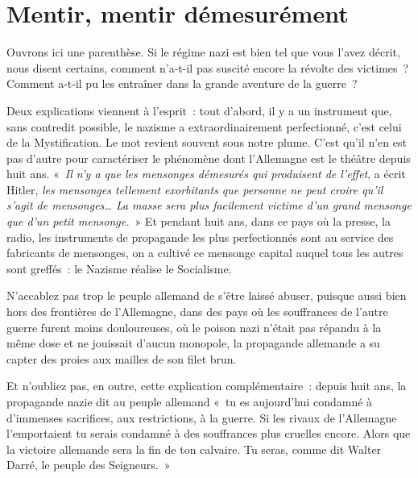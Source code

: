 \documentclass[french,twoside]{book} %
\begin{document}
\section[Mentir, mentir démesurément]{Mentir, mentir démesurément}
\noindent Ouvrons ici une parenthèse. Si le régime nazi est bien tel que vous l’avez décrit, nous disent certains, comment n’a-t-il pas suscité encore la révolte des victimes ? Comment a-t-il pu les entraîner dans la grande aventure de la guerre ?\par
Deux explications viennent à l’esprit : tout d’abord, il y a un instrument que, sans contredit possible, le nazisme a extraordinairement perfectionné, c’est celui de la Mystification. Le mot revient souvent sous notre plume. C’est qu’il n’en est pas d’autre pour caractériser le phénomène dont l’Allemagne est le théâtre depuis huit ans. « \emph{Il n’y a que les mensonges démesurés qui produisent de l’effet}, a écrit Hitler, \emph{les mensonges tellement exorbitants que personne ne peut croire qu’il s’agit de mensonges… La masse sera plus facilement victime d’un grand mensonge que d’un petit mensonge.} » Et pendant huit ans, dans ce pays où la presse, la radio, les instruments de propagande les plus perfectionnés sont au service des fabricants de mensonges, on a cultivé ce mensonge capital auquel tous les autres sont greffés : le Nazisme réalise le Socialisme.\par
N’accablez pas trop le peuple allemand de s’être laissé abuser, puisque aussi bien hors des frontières de l’Allemagne, dans des pays où les souffrances de l’autre guerre furent moins douloureuses, où le poison nazi n’était pas répandu à la même dose et ne jouissait d’aucun monopole, la propagande allemande a su capter des proies aux mailles de son filet brun.\par
Et n’oubliez pas, en outre, cette explication complémentaire : depuis huit ans, la propagande nazie dit au peuple allemand « tu es aujourd’hui condamné à d’immenses sacrifices, aux restrictions, à la guerre. Si les rivaux de l’Allemagne l’emportaient tu serais condamné à des souffrances plus cruelles encore. Alors que la victoire allemande sera la fin de ton calvaire. Tu seras, comme dit Walter Darré, le peuple des Seigneurs. »
\end{document}
